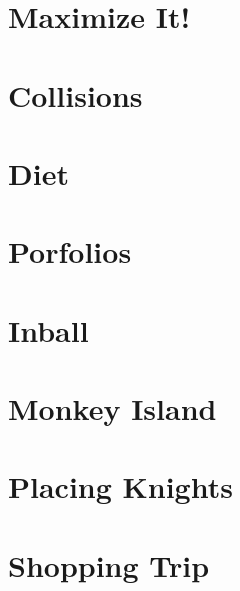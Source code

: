 \documentclass[a4paper, 10pt]{article}
\let\stdsection\section
\renewcommand\section{\newpage\stdsection}
\newcommand{\includecode}[1]{
    }
\newcommand{\algoAuthor}{2} %
\begin{document}
    
    \section{Maximize It!}
        \label{sec:maximize_it}
        \includecode{../problems/w08/Maximize_It/MaximizeIt\algoAuthor.cpp}
        
    \section{Collisions}
        \label{sec:collisions}
        \includecode{../problems/w08/Collisions/Collisions\algoAuthor.cpp}
        
    \section{Diet}
        \label{sec:diet}
        \includecode{../problems/w08/Diet/Diet\algoAuthor.cpp}
        
    \section{Porfolios}
        \label{sec:portfolios}
        \includecode{../problems/w08/Portfolios/Portfolios\algoAuthor.cpp}
    
    \section{Inball}
        \label{sec:inball}
        \includecode{../problems/w08/Inball/Inball\algoAuthor.cpp}
    
    
    \section{Monkey Island}
        \label{sec:monkey_island}
        \includecode{../problems/w09/Monkey_Island/MonkeyIsland\algoAuthor.cpp}
        
    \section{Placing Knights}
        \label{sec:placing_knights}
        \includecode{../problems/w09/Placing_Knights/PlacingKnights\algoAuthor.cpp}
        
    \section{Shopping Trip}
        \label{sec:shopping_trip}
        \includecode{../problems/w09/Shopping_Trip/ShoppingTrip\algoAuthor.cpp}
        
\end{document}

